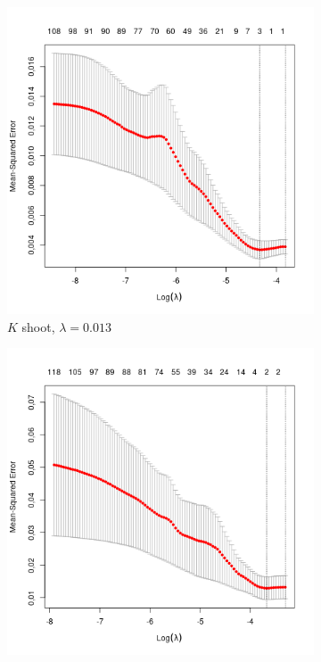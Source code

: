 \documentclass[12pt,journal, onecolumn]{IEEEtran}
\begin{document}
\begin{figure}[h]
\centering
   \begin{subfigure}{0.3\linewidth} \centering
     \includegraphics[width=1\textwidth]{Figures/lambda_kshoot_2.png}
     \caption{$K$ shoot, $\lambda = 0.013$}\label{fig:lambda_kshoot}
   \end{subfigure}
   \begin{subfigure}{0.3\linewidth} \centering
     \includegraphics[width=1\textwidth]{Figures/lambda_BMshoot_2.png}

\end{subfigure}
\end{figure}
\end{document}
